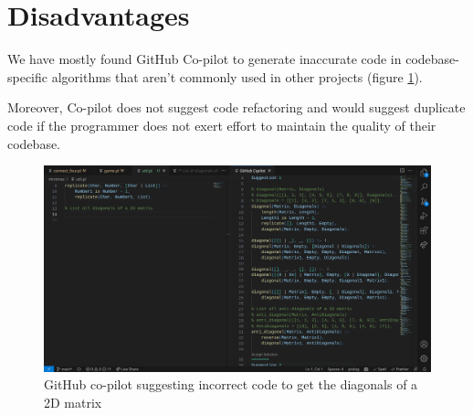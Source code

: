 \documentclass[11pt,a4paper]{article}
\begin{document}
\section{Disadvantages}
We have mostly found GitHub Co-pilot to generate inaccurate code in codebase-specific algorithms that aren't commonly
used in other projects (figure \ref{fig:copilot_diagonal}).

Moreover, Co-pilot does not suggest code refactoring and would suggest duplicate code if the programmer does not exert
effort to maintain the quality of their codebase.

\begin{figure}
    \includegraphics[width=\textwidth]{copilot-not-helpful-diagonal-predicate}
    \caption{GitHub co-pilot suggesting incorrect code to get the diagonals of a 2D matrix}
    \label{fig:copilot_diagonal}
\end{figure}
\end{document}
